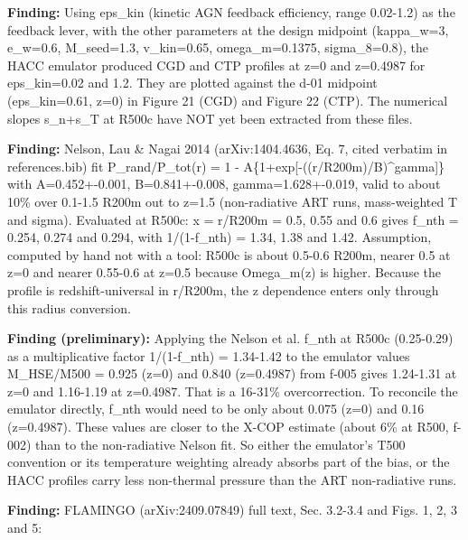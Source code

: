 \documentclass[11pt,a4paper]{article}
\begin{document}
\textbf{Finding:} Using eps\_kin (kinetic AGN feedback efficiency, range 0.02-1.2) as the feedback lever, with the other parameters at the design midpoint (kappa\_w=3, e\_w=0.6, M\_seed=1.3, v\_kin=0.65, omega\_m=0.1375, sigma\_8=0.8), the HACC emulator produced CGD and CTP profiles at z=0 and z=0.4987 for eps\_kin=0.02 and 1.2. They are plotted against the d-01 midpoint (eps\_kin=0.61, z=0) in Figure 21 (CGD) and Figure 22 (CTP). The numerical slopes s\_n+s\_T at R500c have NOT yet been extracted from these files.

\textbf{Finding:} Nelson, Lau \& Nagai 2014 (arXiv:1404.4636, Eq. 7, cited verbatim in references.bib) fit P\_rand/P\_tot(r) = 1 - A\{1+exp[-((r/R200m)/B)\textasciicircum{}gamma]\} with A=0.452+-0.001, B=0.841+-0.008, gamma=1.628+-0.019, valid to about 10\% over 0.1-1.5 R200m out to z=1.5 (non-radiative ART runs, mass-weighted T and sigma). Evaluated at R500c: x = r/R200m = 0.5, 0.55 and 0.6 gives f\_nth = 0.254, 0.274 and 0.294, with 1/(1-f\_nth) = 1.34, 1.38 and 1.42. Assumption, computed by hand not with a tool: R500c is about 0.5-0.6 R200m, nearer 0.5 at z=0 and nearer 0.55-0.6 at z=0.5 because Omega\_m(z) is higher. Because the profile is redshift-universal in r/R200m, the z dependence enters only through this radius conversion.

\textbf{Finding (preliminary):} Applying the Nelson et al. f\_nth at R500c (0.25-0.29) as a multiplicative factor 1/(1-f\_nth) = 1.34-1.42 to the emulator values M\_HSE/M500 = 0.925 (z=0) and 0.840 (z=0.4987) from f-005 gives 1.24-1.31 at z=0 and 1.16-1.19 at z=0.4987. That is a 16-31\% overcorrection. To reconcile the emulator directly, f\_nth would need to be only about 0.075 (z=0) and 0.16 (z=0.4987). These values are closer to the X-COP estimate (about 6\% at R500, f-002) than to the non-radiative Nelson fit. So either the emulator's T500 convention or its temperature weighting already absorbs part of the bias, or the HACC profiles carry less non-thermal pressure than the ART non-radiative runs.

\textbf{Finding:} FLAMINGO (arXiv:2409.07849) full text, Sec. 3.2-3.4 and Figs. 1, 2, 3 and 5:
\end{document}
